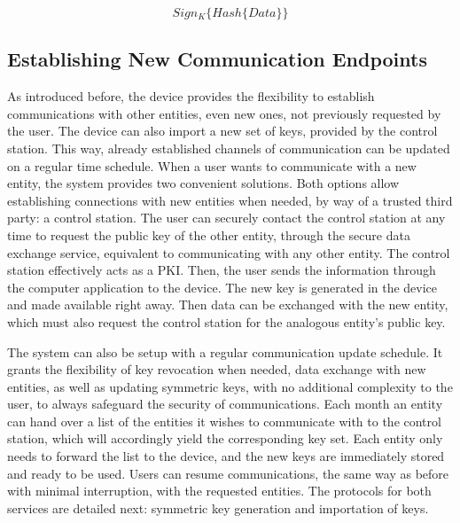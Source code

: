 \begin{equation}
	\label{eq:signature-generate}
	Sign_{K}\{Hash\{Data\}\}
\end{equation}



\subsection{Establishing New Communication Endpoints}\label{chap:arch:services:new-comms}

As introduced before, the device provides the flexibility to establish communications with other entities, even new ones, not previously requested by the user.
The device can also import a new set of keys, provided by the control station.
This way, already established channels of communication can be updated on a regular time schedule.
When a user wants to communicate with a new entity, the system provides two convenient solutions.
Both options allow establishing connections with new entities when needed, by way of a trusted third party: a control station. 
The user can securely contact the control station at any time to request the public key of the other entity, through the secure data exchange service, equivalent to communicating with any other entity. The control station effectively acts as a PKI.
Then, the user sends the information through the computer application to the device. The new key is generated in the device and made available right away. Then data can be exchanged with the new entity, which must also request the control station for the analogous entity's public key.

The system can also be setup with a regular communication update schedule. It grants the flexibility of key revocation when needed, data exchange with new entities, as well as updating symmetric keys, with no additional complexity to the user, to always safeguard the security of communications.
Each month an entity can hand over a list of the entities it wishes to communicate with to the control station, which will accordingly yield the corresponding key set.
Each entity only needs to forward the list to the device, and the new keys are immediately stored and ready to be used.
Users can resume communications, the same way as before with minimal interruption, with the requested entities.
The protocols for both services are detailed next: symmetric key generation and importation of keys.

